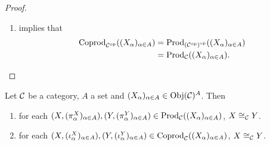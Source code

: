 \documentclass{book}
\begin{document}
\begin{proof}
\begin{enumerate}
			Since $\Prod_{\op{\MC}}((X_{\al})_{\al \in A}) \subset \Coprod_{\MC}((X_{\al})_{\al \in A})$ and $\Coprod_{\MC}((X_{\al})_{\al \in A}) \subset \Prod_{\op{\MC}}((X_{\al})_{\al \in A})$, we have that $\Prod_{\op{\MC}}((X_{\al})_{\al \in A}) = \Coprod_{\MC}((X_{\al})_{\al \in A})$. 
			\item {} implies that 
			\begin{align*}
				\operatorname{Coprod}_{{\mathcal{C}}^{\text{op}}}((X_{\alpha})_{\alpha \in A})
				& = \operatorname{Prod}_{{({\mathcal{C}}^{\text{op}})}^{\text{op}}}((X_{\alpha})_{\alpha \in A}) \\
				& = \operatorname{Prod}_{\mathcal{C}}((X_{\alpha})_{\alpha \in A}).
			\end{align*}
		\end{enumerate}
	\end{proof}
	
	\begin{ex}
		Let $\mathcal{C}$ be a category, $A$ a set  and $(X_{\alpha})_{\alpha \in A} \in \operatorname{Obj}(\mathcal{C})^A$. Then 
		\begin{enumerate}
			\item for each $(X, (\pi^X_{\alpha})_{\alpha \in A}), (Y, (\pi^Y_{\alpha})_{\alpha \in A}) \in \operatorname{Prod}_{\mathcal{C}}((X_{\alpha})_{\alpha \in A})$, $X \cong_{\mathcal{C}} Y$. 
			\item for each $(X, (\iota^X_{\alpha})_{\alpha \in A}), (Y, (\iota^Y_{\alpha})_{\alpha \in A}) \in \operatorname{Coprod}_{\mathcal{C}}((X_{\alpha})_{\alpha \in A})$, $X \cong_{\mathcal{C}} Y$. 
		\end{enumerate}
	\end{ex}
	
\end{document}
